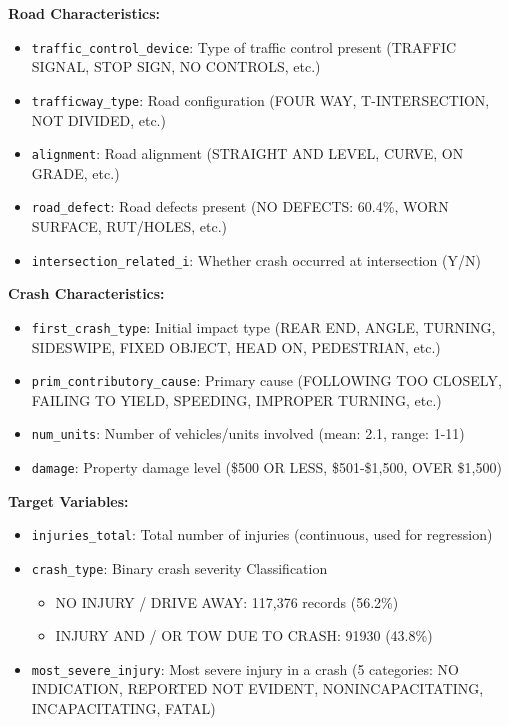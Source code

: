 \documentclass[stu,12pt,floatsintext]{apa7}
\begin{document}
\textbf{Road Characteristics:}
\begin{itemize}
    \item \texttt{traffic\_control\_device}: Type of traffic control present (TRAFFIC SIGNAL, STOP SIGN, NO CONTROLS, etc.)
    \item \texttt{trafficway\_type}: Road configuration (FOUR WAY, T-INTERSECTION, NOT DIVIDED, etc.)
    \item \texttt{alignment}: Road alignment (STRAIGHT AND LEVEL, CURVE, ON GRADE, etc.)
    \item \texttt{road\_defect}: Road defects present (NO DEFECTS: 60.4\%, WORN SURFACE, RUT/HOLES, etc.)
    \item \texttt{intersection\_related\_i}: Whether crash occurred at intersection (Y/N)
\end{itemize}

\textbf{Crash Characteristics:}
\begin{itemize}
    \item \texttt{first\_crash\_type}: Initial impact type (REAR END, ANGLE, TURNING, SIDESWIPE, FIXED OBJECT, HEAD ON, PEDESTRIAN, etc.)
    \item \texttt{prim\_contributory\_cause}: Primary cause (FOLLOWING TOO CLOSELY, FAILING TO YIELD, SPEEDING, IMPROPER TURNING, etc.)
    \item \texttt{num\_units}: Number of vehicles/units involved (mean: 2.1, range: 1-11)
    \item \texttt{damage}: Property damage level (\$500 OR LESS, \$501-\$1,500, OVER \$1,500)
\end{itemize}

\textbf{Target Variables:}
\begin{itemize}
    \item \texttt{injuries\_total}: Total number of injuries (continuous, used for regression)
    \item \texttt{crash\_type}: Binary crash severity Classification
    \begin{itemize}
        \item NO INJURY / DRIVE AWAY: 117,376 records (56.2\%)
        \item INJURY AND / OR TOW DUE TO CRASH: 91930 (43.8\%)
    \end{itemize}
    \item \texttt{most\_severe\_injury}: Most severe injury in a crash (5 categories: NO INDICATION, REPORTED NOT EVIDENT, NONINCAPACITATING, INCAPACITATING, FATAL)
\end{itemize}
\end{document}

